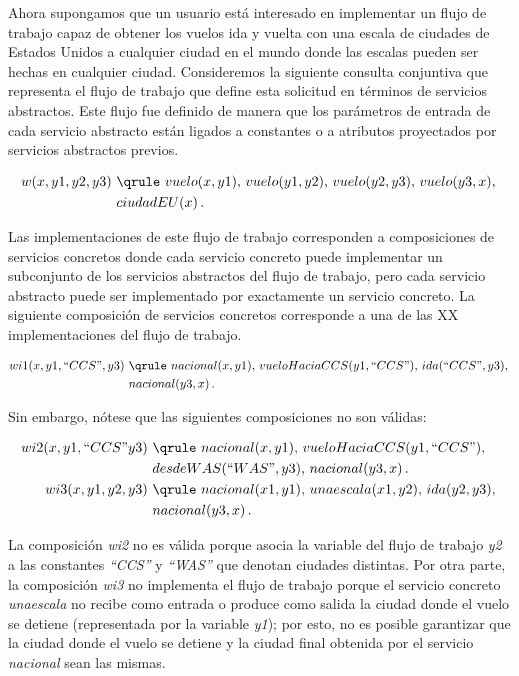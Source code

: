 Ahora supongamos que un usuario está interesado en implementar un flujo de
trabajo capaz de obtener los vuelos ida y vuelta con una escala de ciudades de
Estados Unidos a cualquier ciudad en el mundo donde las escalas pueden ser
hechas en cualquier ciudad. Consideremos la siguiente consulta conjuntiva que
representa el flujo de trabajo que define esta solicitud en términos de
servicios abstractos. Este flujo fue definido de manera que los parámetros de
entrada de cada servicio abstracto están ligados a constantes o a
atributos proyectados por servicios abstractos previos.

\begin{alignat*}{1}
w(x,y1,y2,y3)\ &\qrule\ vuelo(x,y1),\, vuelo(y1,y2),\,  vuelo(y2,y3),\,  vuelo(y3,x),\,  \\
                   \ & ciudadEU(x)\,. \\
\end{alignat*}

Las implementaciones de este flujo de trabajo corresponden a composiciones de
servicios concretos donde cada servicio concreto puede implementar un
subconjunto de los servicios abstractos del flujo de trabajo, pero cada servicio
abstracto puede ser implementado por exactamente un servicio concreto. La
siguiente composición de servicios concretos corresponde a una de las XX
implementaciones del flujo de trabajo.

\begin{alignat*}{1}
wi1(x,y1,``CCS",y3)\ &\qrule\ nacional(x,y1),\, vueloHaciaCCS(y1,``CCS"),\, ida(``CCS",y3),\,  \\
\ & nacional(y3,x)\,.  \\
\end{alignat*}

Sin embargo, nótese que las siguientes composiciones no son válidas:

\begin{alignat*}{1}
wi2(x,y1,``CCS"y3)\ &\qrule\ nacional(x,y1),\, vueloHaciaCCS(y1,``CCS"),\, \\
\ & desdeWAS(``WAS",y3),\,  nacional(y3,x)\,. \\
wi3(x,y1,y2,y3)\ &\qrule\ nacional(x1,y1),\, unaescala(x1,y2),\,  ida(y2,y3),\,  \\
\ & nacional(y3,x)\,. \\
\end{alignat*}

La composición {\it wi2} no es válida porque asocia la variable del flujo de
trabajo {\it y2} a las constantes {\it ``CCS''} y {\it ``WAS''} que denotan
ciudades
distintas. Por otra parte, la composición {\it wi3} no implementa el flujo de
trabajo porque el servicio concreto {\it unaescala} no recibe como entrada o
produce como salida la ciudad donde el vuelo se detiene (representada por la
variable {\it y1}); por esto, no es posible garantizar que la ciudad donde el
vuelo se detiene y la ciudad final obtenida por el servicio {\it nacional} sean
las mismas.

